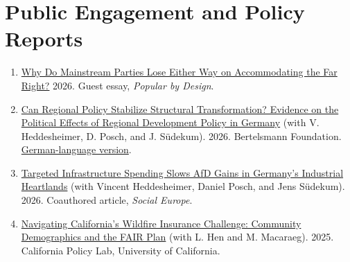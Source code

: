 \documentclass[letterpaper, 10pt]{article}
\newif\ifjobmarket
\newif\ifmerit
\begin{document}
  \ifjobmarket\ifmerit\enlargethispage{5\baselineskip}\fi\fi
  \vspace*{-0.2cm}
  \section*{Public Engagement and Policy Reports}
  \begin{enumerate}
  \item \href{https://www.popularbydesign.org/p/why-do-mainstream-parties-lose-either}{Why Do Mainstream Parties Lose Either Way on Accommodating the Far Right?} 2026. Guest essay, \textit{Popular by Design}.
	  \item \href{https://www.bertelsmann-stiftung.de/fileadmin/files/BSt/Publikationen/GrauePublikationen/Study_Can_Regional_Policy_Stabilize_Structural_Transformation.pdf}{Can Regional Policy Stabilize Structural Transformation? Evidence on the Political Effects of Regional Development Policy in Germany} (with V. Heddesheimer, D. Posch, and J. S\"udekum). 2026. Bertelsmann Foundation. \href{https://www.bertelsmann-stiftung.de/de/publikationen/publikation/did/regionalpolitik-als-stabilitaetsanker-im-strukturwandel}{German-language version}.\ifjobmarket \\
	  \textit{Media coverage:} \href{https://www.spiegel.de/wirtschaft/foerderpolitik-in-deutschland-wie-subventionen-den-afd-zuspruch-daempfen-a-fd739e9b-8ce8-427b-aa33-bf86fbfd71bc}{Der Spiegel}, \href{https://www.faz.net/aktuell/wirtschaft/mit-gezielten-subventionen-gegen-die-afd-accg-200859446.html}{Frankfurter Allgemeine Zeitung}, and \href{https://www.profil.at/dasfruehstueck/wie-100-euro-stimmen-fuer-afd-und-fpoe-verhindern-koennen/403162232}{profil}.\fi
  \item \href{https://www.socialeurope.eu/targeted-infrastructure-spending-slows-afd-gains-in-germanys-industrial-heartlands}{Targeted Infrastructure Spending Slows AfD Gains in Germany's Industrial Heartlands} (with Vincent Heddesheimer, Daniel Posch, and Jens S\"udekum). 2026. Coauthored article, \textit{Social Europe}.
  \item \href{https://capolicylab.org/navigating-californias-wildfire-insurance-challenge-community-demographics-and-the-fair-plan/}{Navigating California's Wildfire Insurance Challenge: Community Demographics and the FAIR Plan} (with L. Hen and M. Macaraeg). 2025. California Policy Lab, University of California.
  \end{enumerate}
\end{document}
